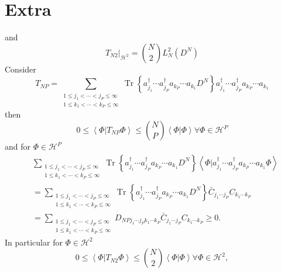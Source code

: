 \documentclass[aps,preprint]{revtex4}%
\begin{document}
\section{Extra}

and
\begin{equation}
\left.  T_{N2}\right\vert _{\mathcal{H}^{2}}=\binom{N}{2}L_{N}^{2}\left(
D^{N}\right)
\end{equation}
Consider
\begin{equation}
T_{NP}=\sum_{\substack{1\leq j_{1}<\cdots<j_{P}\leq\infty\\1\leq k_{1}%
<\cdots<k_{P}\leq\infty}}\operatorname{Tr}\left\{  a_{j_{1}}^{\dagger}\cdots
a_{j_{P}}^{\dagger}a_{k_{P}}\cdots a_{k_{1}}D^{N}\right\}  a_{j_{1}}^{\dagger
}\cdots a_{j_{P}}^{\dagger}a_{k_{P}}\cdots a_{k_{1}}%
\end{equation}
then
\begin{equation}
0\leq\left\langle \left.  \Phi\right\vert T_{NP}\Phi\right\rangle \leq
\binom{N}{P}\left\langle \left.  \Phi\right\vert \Phi\right\rangle \text{
}\forall\Phi\in\mathcal{H}^{P}%
\end{equation}
and for $\Phi\in\mathcal{H}^{P}$
\begin{align}
&  \sum_{\substack{1\leq j_{1}<\cdots<j_{P}\leq\infty\\1\leq k_{1}%
<\cdots<k_{P}\leq\infty}}\operatorname{Tr}\left\{  a_{j_{1}}^{\dagger}\cdots
a_{j_{P}}^{\dagger}a_{k_{P}}\cdots a_{k_{1}}D^{N}\right\}  \left\langle
\left.  \Phi\right\vert a_{j_{1}}^{\dagger}\cdots a_{j_{P}}^{\dagger}a_{k_{P}%
}\cdots a_{k_{1}}\Phi\right\rangle \\
&  =\sum_{\substack{1\leq j_{1}<\cdots<j_{P}\leq\infty\\1\leq k_{1}%
<\cdots<k_{P}\leq\infty}}\operatorname{Tr}\left\{  a_{j_{1}}^{\dagger}\cdots
a_{j_{P}}^{\dagger}a_{k_{P}}\cdots a_{k_{1}}D^{N}\right\}  \bar{C}%
_{j_{1}\cdots j_{P}}C_{k_{1}\cdots k_{P}}\\
&  =\sum_{\substack{1\leq j_{1}<\cdots<j_{P}\leq\infty\\1\leq k_{1}%
<\cdots<k_{P}\leq\infty}}D_{NPj_{1}\cdots j_{P}k_{1}\cdots k_{P}}\bar
{C}_{j_{1}\cdots j_{P}}C_{k_{1}\cdots k_{P}}\geq0.
\end{align}
In particular for $\Phi\in\mathcal{H}^{2}$
\begin{equation}
0\leq\left\langle \left.  \Phi\right\vert T_{N2}\Phi\right\rangle \leq
\binom{N}{2}\left\langle \left.  \Phi\right\vert \Phi\right\rangle \text{
}\forall\Phi\in\mathcal{H}^{2},
\end{equation}%
\end{document}
